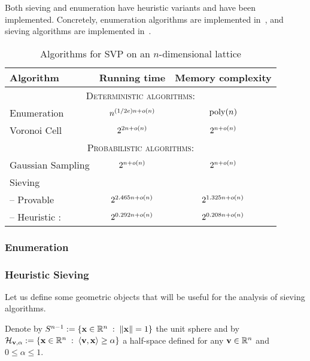 Both sieving and enumeration have heuristic variants  and have been implemented. Concretely,  enumeration algorithms are implemented in~\cite{fpylll}, and sieving algorithms are implemented in~\cite{g6k}. 

{
\renewcommand\arraystretch{1.4}
\begin{table}[h]
	\centering
	\begin{tabular}{| l | c | c |}
		\hline
		\textbf{Algorithm} & \textbf{Running time} & \textbf{Memory complexity} \\ \hline
		\multicolumn{3}{|c|}{\textsc{ Deterministic algorithms:} } \\ \hline
		Enumeration \cite{Kan87,HanSte07} & $n^{ (1/2e) n + o(n)}$ & $\operatorname{poly}(n)$ \\ \hline
		Voronoi Cell \cite{MicVou10} & $2^{2n + o(n)}$ & $2^{n+o(n)}$ \\ \hline
		\multicolumn{3}{|c|}{\textsc{ Probabilistic algorithms:} } \\ \hline
		Gaussian Sampling \cite{ADRS15} & $2^{n+ o(n)}$ & $2^{n+ o(n)}$ \\ \hline
		Sieving \cite{AKS01} & & \\ [-1ex]
		\hspace{5pt} -- Provable \cite{PS09} & $2^{2.465n + o(n)}$& $2^{1.325n + o(n)}$ \\ [-1ex]
		\hspace{5pt} -- Heuristic \cite{BDGL16}: & $2^{0.292n + o(n)}$ & $2^{0.208n + o(n)}$  \\  \hline
	\end{tabular}
	\caption[Algorithms for SVP]{Algorithms for SVP on an $n$-dimensional lattice} 
	
	\label{table:SVPAlgs}
\end{table} 

}
\subsubsection{Enumeration}

\subsubsection{Heuristic Sieving}

Let us define some geometric objects that will be useful for the analysis of sieving algorithms.

Denote by $S^{n-1}:=\{ \mathbf x \in \mathbb{R}^n \; : \; \|\mathbf x \| = 1 \}$ the unit sphere and by $\mathcal{H}_{\mathbf v, \alpha}:=\{\mathbf x \in \mathbb{R}^n \; : \; \langle\mathbf v, \mathbf x \rangle \geq \alpha\}$ a half-space defined for any $\mathbf v \in \mathbb{R}^n$ and $0 \leq \alpha \leq 1$.

